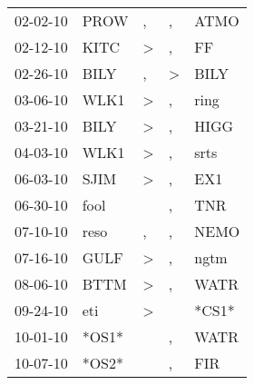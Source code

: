 \begin{supertabular}{p{0.07\textwidth}p{0.06\textwidth}p{0.02\textwidth}p{0.02\textwidth}p{0.06\textwidth}}
          02-02-10\textsuperscript{} &           PROW\textsuperscript{} &                , &                , &           ATMO\textsuperscript{} \\
          02-12-10\textsuperscript{} &           KITC\textsuperscript{} &     \textgreater &                , &             FF\textsuperscript{} \\
          02-26-10\textsuperscript{} &           BILY\textsuperscript{} &                , &     \textgreater &           BILY\textsuperscript{} \\
          03-06-10\textsuperscript{} &           WLK1\textsuperscript{} &     \textgreater &                , &           ring\textsuperscript{} \\
          03-21-10\textsuperscript{} &           BILY\textsuperscript{} &     \textgreater &                , &           HIGG\textsuperscript{} \\
          04-03-10\textsuperscript{} &           WLK1\textsuperscript{} &     \textgreater &                , &           srts\textsuperscript{} \\
          06-03-10\textsuperscript{} &           SJIM\textsuperscript{} &     \textgreater &                , &            EX1\textsuperscript{} \\
          06-30-10\textsuperscript{} &           fool\textsuperscript{} &                  &                , &            TNR\textsuperscript{} \\
          07-10-10\textsuperscript{} &           reso\textsuperscript{} &                , &                , &           NEMO\textsuperscript{} \\
          07-16-10\textsuperscript{} &           GULF\textsuperscript{} &     \textgreater &                , &           ngtm\textsuperscript{} \\
          08-06-10\textsuperscript{} &           BTTM\textsuperscript{} &     \textgreater &                , &           WATR\textsuperscript{} \\
          09-24-10\textsuperscript{} &            eti\textsuperscript{} &     \textgreater &                  &                            *CS1* \\
          10-01-10\textsuperscript{} &                            *OS1* &                  &                , &           WATR\textsuperscript{} \\
          10-07-10\textsuperscript{} &                            *OS2* &                  &                , &            FIR\textsuperscript{} \\

\end{supertabular}
